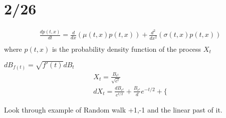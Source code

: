 \documentclass[answers,12pt,addpoints]{exam}
\begin{document}
\section{2/26}
\begin{definition}
    \begin{gather*}
        \frac{d p(t,x)}{dt} = \frac{d}{dx} (\mu(t,x)p(t,x)) + \frac{d^2}{dx^2} (\sigma(t,x)p(t,x))\\  
    \end{gather*}
    where $p(t,x)$ is the probability density function of the process $X_t$\\
\end{definition}
\begin{definition}[$B_{f(t)}$]
    $d B_{f(t)} = \sqrt{f'(t)} dB_t$\\
    \begin{gather*}
        X_t = \frac{B_{e^t}}{\sqrt{e^t}} \\
        dX_t = \frac{dB_{e^t}}{e^{t/2}} + \frac{B_{e^t}}de^{-t/2} + \lbrace 
    \end{gather*}
\end{definition}
Look through example of Random walk +1,-1 and the linear past of it. 
\end{document}
